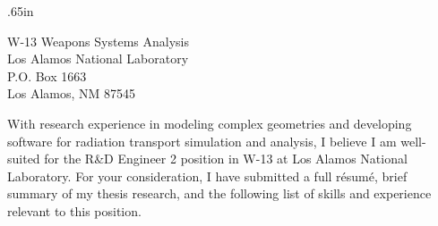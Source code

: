 
\begin{center}
\begin{minipage}{\textwidth}

  \normalsize

	\vspace{1mm}
  
  \begingroup
  \leftskip.65in
  \rightskip\leftskip

W-13 Weapons Systems Analysis\\
Los Alamos National Laboratory \\
P.O. Box 1663 \\
Los Alamos, NM 87545
  
  \vspace{3mm} 

With research experience in modeling complex geometries and developing
software for radiation transport simulation and analysis, I believe I am
well-suited for the R\&D Engineer 2  position in W-13
at Los Alamos National Laboratory.
For your consideration, I have submitted a full r\'{e}sum\'{e}, brief summary of my thesis research, and
the following list of skills and
experience relevant to this position. \\



\end{minipage}
\end{center}
